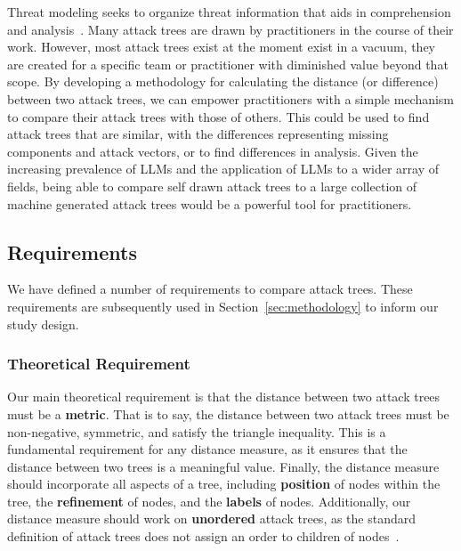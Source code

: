 
Threat modeling seeks to organize threat information that aids in comprehension and analysis~\cite{andersonSecurityEngineeringGuide2020,schneierSecretsLiesDigital2000}. Many attack trees are drawn by practitioners in the course of their work. However, most attack trees exist at the moment exist in a vacuum, they are created for a specific team or practitioner with diminished value beyond that scope. By developing a methodology for calculating the distance (or difference) between two attack trees, we can empower practitioners with a simple mechanism to compare their attack trees with those of others. This could be used to find attack trees that are similar, with the differences representing missing components and attack vectors, or to find differences in analysis. Given the increasing prevalence of LLMs and the application of LLMs to a wider array of fields, being able to compare self drawn attack trees to a large collection of machine generated attack trees would be a powerful tool for practitioners.



\subsection{Requirements}
\label{ssec:requirements}

We have defined a number of requirements to compare attack trees. These requirements are subsequently used in Section~\ref{sec:methodology} to inform our study design.

\subsubsection{Theoretical Requirement}

Our main theoretical requirement is that the distance between two attack trees must be a \textbf{metric}. That is to say, the distance between two attack trees must be non-negative, symmetric, and satisfy the triangle inequality. This is a fundamental requirement for any distance measure, as it ensures that the distance between two trees is a meaningful value. Finally, the distance measure should incorporate all aspects of a tree, including \textbf{position} of nodes within the tree, the \textbf{refinement} of nodes, and the \textbf{labels} of nodes. Additionally, our distance measure should work on \textbf{unordered} attack trees, as the standard definition of attack trees does not assign an order to children of nodes~\cite{mauw_foundations_2006}.


